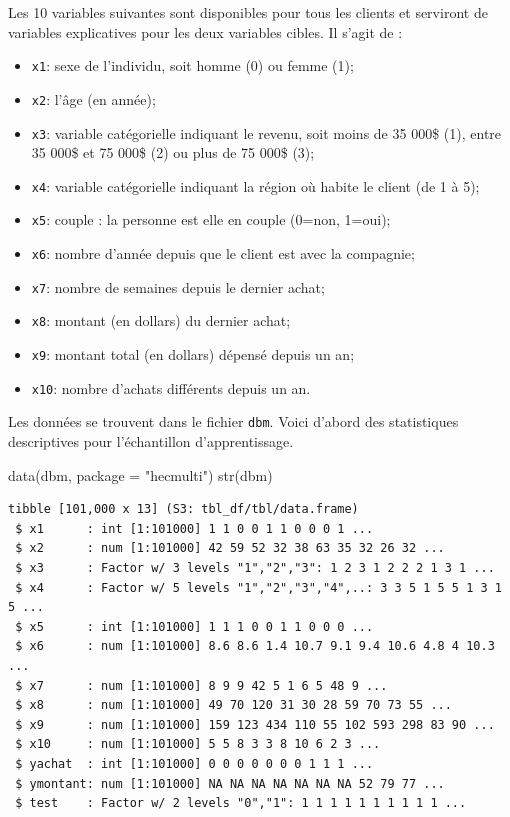 \documentclass[
  11pt,
  letterpaper,
]{scrbook}
\newenvironment{Shaded}{\begin{snugshade}}{\end{snugshade}}
\newcommand{\AttributeTok}[1]{\textcolor[rgb]{0.40,0.45,0.13}{#1}}
\newcommand{\FunctionTok}[1]{\textcolor[rgb]{0.28,0.35,0.67}{#1}}
\newcommand{\NormalTok}[1]{\textcolor[rgb]{0.00,0.23,0.31}{#1}}
\newcommand{\StringTok}[1]{\textcolor[rgb]{0.13,0.47,0.30}{#1}}
\providecommand{\tightlist}{%
  \setlength{\itemsep}{0pt}\setlength{\parskip}{0pt}}\usepackage{longtable,booktabs,array}
\theoremstyle{definition}
\theoremstyle{remark}
\begin{document}
Les 10 variables suivantes sont disponibles pour tous les clients et
serviront de variables explicatives pour les deux variables cibles. Il
s'agit de :

\begin{itemize}
\tightlist
\item
  \texttt{x1}: sexe de l'individu, soit homme (0) ou femme (1);
\item
  \texttt{x2}: l'âge (en année);
\item
  \texttt{x3}: variable catégorielle indiquant le revenu, soit moins de
  35 000\$ (1), entre 35 000\$ et 75 000\$ (2) ou plus de 75 000\$ (3);
\item
  \texttt{x4}: variable catégorielle indiquant la région où habite le
  client (de 1 à 5);
\item
  \texttt{x5}: couple : la personne est elle en couple (0=non, 1=oui);
\item
  \texttt{x6}: nombre d'année depuis que le client est avec la
  compagnie;
\item
  \texttt{x7}: nombre de semaines depuis le dernier achat;
\item
  \texttt{x8}: montant (en dollars) du dernier achat;
\item
  \texttt{x9}: montant total (en dollars) dépensé depuis un an;
\item
  \texttt{x10}: nombre d'achats différents depuis un an.
\end{itemize}

Les données se trouvent dans le fichier \texttt{dbm}. Voici d'abord des
statistiques descriptives pour l'échantillon d'apprentissage.

\begin{Shaded}
\begin{Highlighting}[]
\FunctionTok{data}\NormalTok{(dbm, }\AttributeTok{package =} \StringTok{"hecmulti"}\NormalTok{)}
\FunctionTok{str}\NormalTok{(dbm)}
\end{Highlighting}
\end{Shaded}

\begin{verbatim}
tibble [101,000 x 13] (S3: tbl_df/tbl/data.frame)
 $ x1      : int [1:101000] 1 1 0 0 1 1 0 0 0 1 ...
 $ x2      : num [1:101000] 42 59 52 32 38 63 35 32 26 32 ...
 $ x3      : Factor w/ 3 levels "1","2","3": 1 2 3 1 2 2 2 1 3 1 ...
 $ x4      : Factor w/ 5 levels "1","2","3","4",..: 3 3 5 1 5 5 1 3 1 5 ...
 $ x5      : int [1:101000] 1 1 1 0 0 1 1 0 0 0 ...
 $ x6      : num [1:101000] 8.6 8.6 1.4 10.7 9.1 9.4 10.6 4.8 4 10.3 ...
 $ x7      : num [1:101000] 8 9 9 42 5 1 6 5 48 9 ...
 $ x8      : num [1:101000] 49 70 120 31 30 28 59 70 73 55 ...
 $ x9      : num [1:101000] 159 123 434 110 55 102 593 298 83 90 ...
 $ x10     : num [1:101000] 5 5 8 3 3 8 10 6 2 3 ...
 $ yachat  : int [1:101000] 0 0 0 0 0 0 0 1 1 1 ...
 $ ymontant: num [1:101000] NA NA NA NA NA NA NA 52 79 77 ...
 $ test    : Factor w/ 2 levels "0","1": 1 1 1 1 1 1 1 1 1 1 ...
\end{verbatim}
\end{document}

